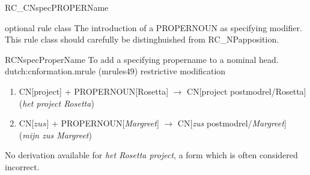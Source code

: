 \begin{mruleclass}{RC\_CNspecPROPERName}
\begin{classdescr}
\kind optional rule class
\classtask The introduction of a PROPERNOUN as specifying modifier.
\classremarks
This rule class should carefully be distinghuished from RC\_NPapposition.
\nofilters
\nospeedrules
\noplannedrules
\norulesnotince
\begin{comments}
\end{comments}

\end{classdescr}

\begin{members}
\begin{member}
 RCNspecProperName
 To add a specifying propername to a nominal head.
\file dutch:cnformation.mrule (mrules49)
\semantics restrictive modification
\example 
\begin{enumerate} 
\item
CN[project] + PROPERNOUN[Rosetta] $\rightarrow$ CN[project postmodrel/Rosetta]
({\em het project Rosetta})
\item
CN[$zus$] + PROPERNOUN[{\em Margreet}] $\rightarrow$ CN[{\em zus} 
postmodrel/{\em Margreet}]
({\em mijn zus Margreet})
\end{enumerate}
\remarks No derivation available for {\em het Rosetta project}, a form which is 
often
considered incorrect.
\end{member}

\end{members}   
\end{mruleclass}


